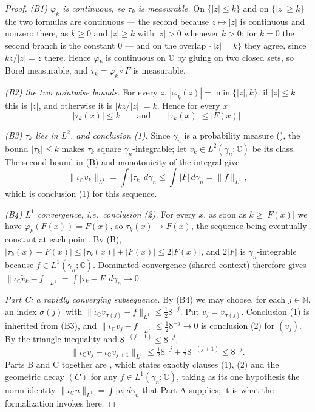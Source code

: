 \begin{proof}
\emph{(B1) $\varphi_k$ is continuous, so $\tau_k$ is measurable.}  On
$\{|z| \leq k\}$ and on $\{|z| \geq k\}$ the two formulas are continuous --- the
second because $z \mapsto |z|$ is continuous and nonzero there, as $k \geq 0$ and
$|z| \geq k$ with $|z| > 0$ whenever $k > 0$; for $k = 0$ the second branch is
the constant $0$ --- and on the overlap $\{|z| = k\}$ they agree, since
$k z/|z| = z$ there.  Hence $\varphi_k$ is continuous on $\mathbb{C}$ by gluing
on two closed sets, so Borel measurable, and $\tau_k = \varphi_k \circ F$ is
measurable.

\emph{(B2) the two pointwise bounds.}  For every $z$, $|\varphi_k(z)|
= \min\{|z|, k\}$: if $|z| \leq k$ this is $|z|$, and otherwise it is
$|k z/|z|| = k$.  Hence for every $x$
\begin{equation*}
  |\tau_k(x)| \leq k \qquad\text{and}\qquad |\tau_k(x)| \leq |F(x)| . \tag{B}
\end{equation*}

\emph{(B3) $\tau_k$ lies in $L^2$, and conclusion (1).}  Since $\gamma_n$ is a
probability measure (), the bound $|\tau_k| \leq k$ makes
$\tau_k$ square $\gamma_n$-integrable; let $\tilde v_k \in L^2(\gamma_n;\mathbb{C})$
be its class.  The second bound in (B) and monotonicity of the integral give
\[
  \|\iota_{\mathbb{C}}\tilde v_k\|_{L^1} = \int|\tau_k|\,d\gamma_n
    \leq \int|F|\,d\gamma_n = \|f\|_{L^1} ,
\]
which is conclusion (1) for this sequence.

\emph{(B4) $L^1$ convergence, i.e.\ conclusion (2).}  For every $x$, as soon as
$k \geq |F(x)|$ we have $\varphi_k(F(x)) = F(x)$, so $\tau_k(x) \to F(x)$, the
sequence being eventually constant at each point.  By (B),
$|\tau_k(x) - F(x)| \leq |\tau_k(x)| + |F(x)| \leq 2|F(x)|$, and $2|F|$ is
$\gamma_n$-integrable because $f \in L^1(\gamma_n;\mathbb{C})$.  Dominated
convergence (shared context) therefore gives
$\|\iota_{\mathbb{C}}\tilde v_k - f\|_{L^1} = \int|\tau_k - F|\,d\gamma_n \to 0$.

\emph{Part C: a rapidly converging subsequence.}
By (B4) we may choose, for each $j \in \mathbb{N}$, an index $\sigma(j)$ with
$\|\iota_{\mathbb{C}}\tilde v_{\sigma(j)} - f\|_{L^1} \leq \tfrac12 8^{-j}$.  Put
$v_j = \tilde v_{\sigma(j)}$.  Conclusion (1) is inherited from (B3), and
$\|\iota_{\mathbb{C}} v_j - f\|_{L^1} \leq \tfrac12 8^{-j} \to 0$ is conclusion
(2) for $(v_j)$.  By the triangle inequality and $8^{-(j+1)} \leq 8^{-j}$,
\begin{equation*}
  \|\iota_{\mathbb{C}} v_j - \iota_{\mathbb{C}} v_{j+1}\|_{L^1}
    \leq \tfrac12 8^{-j} + \tfrac12 8^{-(j+1)} \leq 8^{-j} . \tag{C}
\end{equation*}
Parts B and C together are , which states
exactly clauses (1), (2) and the geometric decay $(C)$ for any $f \in L^1(\gamma_n;\mathbb{C})$,
taking as its one hypothesis the norm identity $\|\iota_{\mathbb{C}} u\|_{L^1} = \int|u|\,d\gamma_n$
that Part A supplies; it is what the formalization invokes here.


\end{proof}

